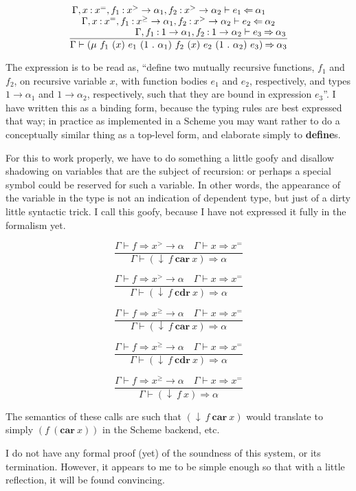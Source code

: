 \documentclass{article}
\begin{document}
\[
  \frac{
    \splitfrac{
      \splitfrac{
        \Gamma,x\mathbin{:}x^{=},f_{1}\mathbin{:}x^{>}\to\alpha_{1},f_{2}\mathbin{:}x^{>}\to\alpha_{2}\vdash e_{1}\mathbin{\Leftarrow}\alpha_{1}
      }{
        \Gamma,x\mathbin{:}x^{=},f_{1}\mathbin{:}x^{\geq}\to\alpha_{1},f_{2}\mathbin{:}x^{>}\to\alpha_{2}\vdash e_{2}\mathbin{\Leftarrow}\alpha_{2}
      }
    }{
      \Gamma,f_{1}\mathbin{:}1\to\alpha_{1},f_{2}\mathbin{:}1\to\alpha_{2}\vdash e_{3}\mathbin{\Rightarrow}\alpha_{3}
    }
  }{
    \Gamma\vdash
    (\mu~f_{1}~(x)~e_{1}~(1~.~\alpha_{1})~f_{2}~(x)~e_{2}~(1~.~\alpha_{2})~e_{3})\mathbin{\Rightarrow}\alpha_{3}
  }
\]

The expression is to be read as, ``define two mutually recursive functions,
$f_{1}$ and $f_{2}$, on recursive variable $x$, with function bodies $e_{1}$ and
$e_{2}$, respectively, and types $1\to\alpha_{1}$ and
$1\to\alpha_{2}$, respectively, such that they are bound in
expression $e_{3}$''. I have written this as a binding form, because the typing
rules are best expressed that way; in practice as implemented in a Scheme you
may want rather to do a conceptually similar thing as a top-level form, and
elaborate simply to \textbf{define}s.

For this to work properly, we have to do something a little goofy and disallow
shadowing on variables that are the subject of recursion: or perhaps a special
symbol could be reserved for such a variable. In other words, the appearance of
the variable in the type is not an indication of dependent type, but just of a
dirty little syntactic trick. I call this goofy, because I have not expressed it
fully in the formalism yet.

\[ \frac{\Gamma\vdash f\mathbin{\Rightarrow}x^{>}\to\alpha\quad\Gamma\vdash
    x\mathbin{\Rightarrow}x^{=}}{\Gamma\vdash
    (\downarrow~f~\textbf{car}~x)\mathbin{\Rightarrow}\alpha} \]

\[ \frac{\Gamma\vdash f\mathbin{\Rightarrow}x^{>}\to\alpha\quad\Gamma\vdash
    x\mathbin{\Rightarrow}x^{=}}{\Gamma\vdash
    (\downarrow~f~\textbf{cdr}~x)\mathbin{\Rightarrow}\alpha} \]

\[ \frac{\Gamma\vdash f\mathbin{\Rightarrow}x^{\geq}\to\alpha\quad\Gamma\vdash
    x\mathbin{\Rightarrow}x^{=}}{\Gamma\vdash
    (\downarrow~f~\textbf{car}~x)\mathbin{\Rightarrow}\alpha} \]

\[ \frac{\Gamma\vdash f\mathbin{\Rightarrow}x^{\geq}\to\alpha\quad\Gamma\vdash
    x\mathbin{\Rightarrow}x^{=}}{\Gamma\vdash
    (\downarrow~f~\textbf{cdr}~x)\mathbin{\Rightarrow}\alpha} \]

\[ \frac{\Gamma\vdash f\mathbin{\Rightarrow}x^{\geq}\to\alpha\quad\Gamma\vdash
    x\mathbin{\Rightarrow}x^{=}}{\Gamma\vdash
    (\downarrow~f~x)\mathbin{\Rightarrow}\alpha} \]

The semantics of these calls are such that $(\downarrow~f~\textbf{car}~x)$ would
translate to simply $(f~(\textbf{car}~x))$ in the Scheme backend, etc.

I do not have any formal proof (yet) of the soundness of this system, or its
termination. However, it appears to me to be simple enough so that with a little
reflection, it will be found convincing.
\end{document}
